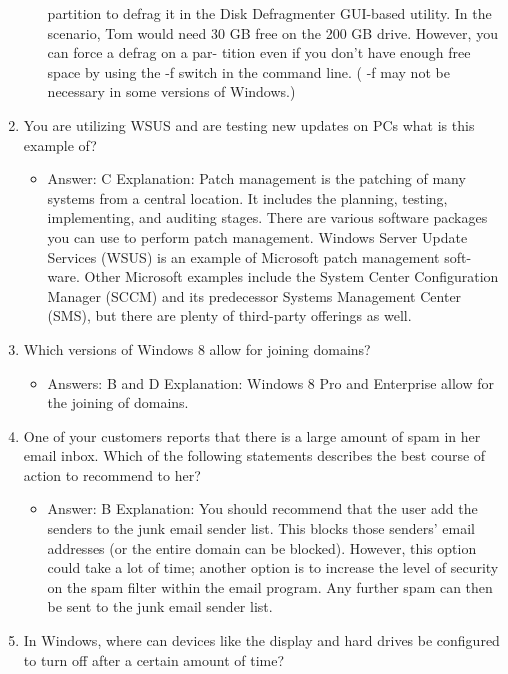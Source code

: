 \documentclass{article}
\begin{document}
\begin{enumerate}
\begin{itemize}
partition to defrag it in the Disk Defragmenter GUI-based utility. In the scenario, Tom
would need 30 GB free on the 200 GB drive. However, you can force a defrag on a par-
tition even if you don’t have enough free space by using the -f switch in the command
line. ( -f may not be necessary in some versions of Windows.)
    \end{itemize}
    \item You are utilizing WSUS and are testing new updates on PCs what is this example of? 
    \begin{itemize}
        \item Answer: C
Explanation: Patch management is the patching of many systems from a central
location. It includes the planning, testing, implementing, and auditing stages. There
are various software packages you can use to perform patch management. Windows
Server Update Services (WSUS) is an example of Microsoft patch management soft-
ware. Other Microsoft examples include the System Center Configuration Manager
(SCCM) and its predecessor Systems Management Center (SMS), but there are plenty
of third-party offerings as well.
    \end{itemize}
    \item Which versions of Windows 8 allow for joining domains? 
    \begin{itemize}
        \item Answers: B and D
Explanation: Windows 8 Pro and Enterprise allow for the joining of domains.
    \end{itemize}
    \item One of your customers reports that there is a large amount of
spam in her email inbox. Which of the following statements
describes the best course of action to recommend to her?
\begin{itemize}
        \item Answer: B
Explanation: You should recommend that the user add the senders to the junk email
sender list. This blocks those senders’ email addresses (or the entire domain can be
blocked). However, this option could take a lot of time; another option is to increase
the level of security on the spam filter within the email program. Any further spam can
then be sent to the junk email sender list.
    \end{itemize}
    \item In Windows, where can devices like the display and hard drives be
configured to turn off after a certain amount of time?
    \begin{itemize}

\end{itemize}
\end{enumerate}
\end{document}
